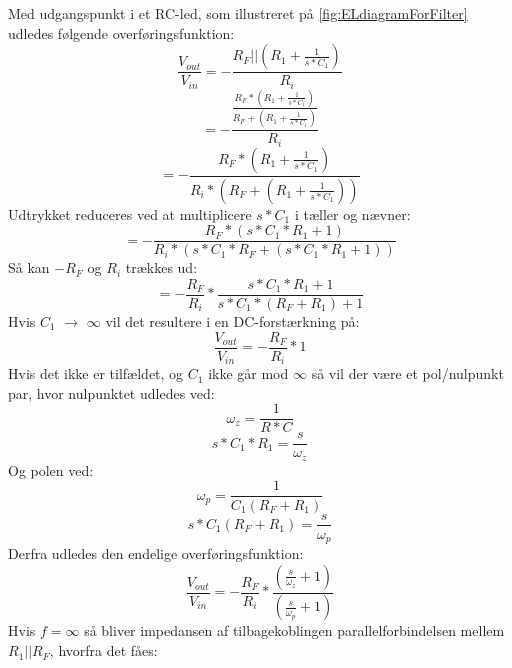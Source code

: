%
Med udgangspunkt i et RC-led, som illustreret på \autoref{fig:ELdiagramForFilter} udledes følgende overføringsfunktion:
%
\begin{equation}
	\frac{V_{out}}{V_{in}} = -\frac{R_F||\left(R_1+\frac{1}{s*C_1}\right)}{R_i}
\end{equation}
%
\begin{equation}
	= - \frac{\frac{R_F*\left(R_1+\frac{1}{s*C_1}\right)}{R_F+\left(R_1+\frac{1}{s*C_1}\right)}}{R_i}
\end{equation}
%
\begin{equation}
	= - \frac{R_F*\left(R_1+\frac{1}{s*C_1}\right)}{R_i*\left(R_F+\left(R_1+\frac{1}{s*C_1}\right)\right)}
\end{equation}
%
Udtrykket reduceres ved at multiplicere $s*C_1$ i tæller og nævner:
%
\begin{equation}
	= - \frac{R_F*\left(s*C_1*R_1+1\right)}{R_i*\left(s*C_1*R_F+\left(s*C_1*R_1+1\right)\right)}
\end{equation}
%
Så kan $-R_F$ og $R_i$ trækkes ud:
%
\begin{equation}
	= -\frac{R_F}{R_i}*\frac{s*C_1*R_1+1}{s*C_1*\left(R_F+R_1\right)+1}
\end{equation}
% 
Hvis $C_1$ $\longrightarrow$ $\infty$ vil det resultere i en DC-forstærkning på:
%
\begin{equation}
	\frac{V_{out}}{V_{in}} = -\frac{R_F}{R_i}*1
\end{equation}
%
Hvis det ikke er tilfældet, og $C_1$ ikke går mod $\infty$ så vil der være et pol/nulpunkt par, hvor nulpunktet udledes ved:
%
\begin{equation}
	\omega_z = \frac{1}{R*C} 
\end{equation}
%
\begin{equation}
	 s*C_1*R_1 = \frac{s}{\omega_z}
\end{equation}
%
Og polen ved:
%
\begin{equation}
	\omega_p = \frac{1}{C_1\left(R_F+R_1\right)}
\end{equation}
%
\begin{equation}
	s*C_1\left(R_F+R_1\right) = \frac{s}{\omega_p}
\end{equation}
%
Derfra udledes den endelige overføringsfunktion:
%
\begin{equation}
	\frac{V_{out}}{V_{in}} = -\frac{R_F}{R_i}*\frac{\left(\frac{s}{\omega_z}+1\right)}{\left(\frac{s}{\omega_p}+1\right)}
\end{equation}
%
Hvis $f = \infty$ så bliver impedansen af tilbagekoblingen parallelforbindelsen mellem $R_1||R_F$, hvorfra det fåes:
